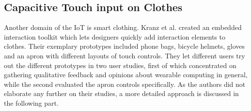 \subsection{Capacitive Touch input on Clothes}
\label{sec:touchInputOnClothes}
Another domain of the IoT is smart clothing. 
Kranz et al. created an embedded interaction toolkit which lets designers quickly add interaction elements to clothes.
Their exemplary prototypes included phone bags, bicycle helmets, gloves and an apron with different layouts of touch controls.
They let different users try out the different prototypes in two user studies, first of which concentrated on gathering qualitative feedback and opinions about wearable computing in general, while the second evaluated the apron controls specifically.
As the authors did not elaborate any further on their studies, a more detailed approach is discussed in the following part.


